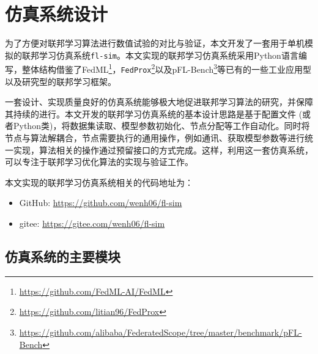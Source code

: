 \newcommand{\urlgithub}{\url{https://github.com/wenh06/fl-sim}}
\newcommand{\urlgitee}{\url{https://gitee.com/wenh06/fl-sim}}

\section{仿真系统设计}
\label{sec:chap5-design}


为了方便对联邦学习算法进行数值试验的对比与验证，本文开发了一套用于单机模拟的联邦学习仿真系统\texttt{fl-sim}。本文实现的联邦学习仿真系统采用Python语言编写，整体结构借鉴了FedML\footnote{\url{https://github.com/FedML-AI/FedML}}\parencite{he_2020_fedml}，\texttt{FedProx}\footnote{\url{https://github.com/litian96/FedProx}}\parencite{sahu2018fedprox}以及pFL-Bench\footnote{\url{https://github.com/alibaba/FederatedScope/tree/master/benchmark/pFL-Bench}}\parencite{chen_2022_pfl_bench}等已有的一些工业应用型以及研究型的联邦学习框架。

一套设计、实现质量良好的仿真系统能够极大地促进联邦学习算法的研究，并保障其持续的进行。本文开发的联邦学习仿真系统的基本设计思路是基于配置文件 (或者Python类)，将数据集读取、模型参数初始化、节点分配等工作自动化。同时将节点与算法解耦合，节点需要执行的通用操作，例如通讯、获取模型参数等进行统一实现，算法相关的操作通过预留接口的方式完成。这样，利用这一套仿真系统，可以专注于联邦学习优化算法的实现与验证工作。

本文实现的联邦学习仿真系统相关的代码地址为：
\begin{itemize}
    \item GitHub: \urlgithub
    \item gitee: \urlgitee
\end{itemize}

\subsection{仿真系统的主要模块}

